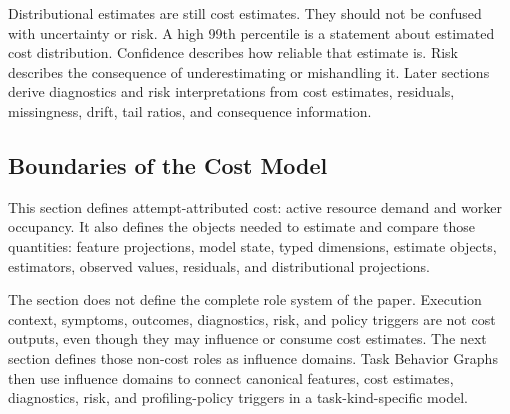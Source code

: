 Distributional estimates are still cost estimates. They should not be confused
with uncertainty or risk. A high 99th percentile is a statement about estimated
cost distribution. Confidence describes how reliable that estimate is. Risk
describes the consequence of underestimating or mishandling it. Later sections
derive diagnostics and risk interpretations from cost estimates, residuals,
missingness, drift, tail ratios, and consequence information.

\subsection{Boundaries of the Cost Model}
\label{sec:cost-model-boundaries}

This section defines attempt-attributed cost: active resource demand and worker
occupancy. It also defines the objects needed to estimate and compare those
quantities: feature projections, model state, typed dimensions, estimate
objects, estimators, observed values, residuals, and distributional projections.

The section does not define the complete role system of the paper. Execution
context, symptoms, outcomes, diagnostics, risk, and policy triggers are not cost
outputs, even though they may influence or consume cost estimates. The next
section defines those non-cost roles as influence domains. Task Behavior Graphs
then use influence domains to connect canonical features, cost estimates,
diagnostics, risk, and profiling-policy triggers in a task-kind-specific model.
